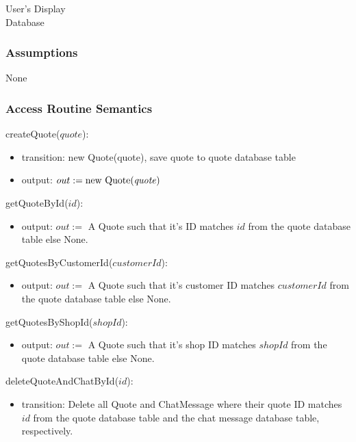 \documentclass[12pt, titlepage]{article}
\begin{document}
User's Display \\ Database

\subsubsection{Assumptions}

None

\subsubsection{Access Routine Semantics}

\noindent createQuote($quote$):
\begin{itemize}
	\item transition: new Quote(quote), save quote to quote database table
	\item output: $out := \text{new Quote(\emph{quote})}$
\end{itemize}

\noindent getQuoteById($id$):
\begin{itemize}
	\item output: $out :=$ A Quote such that it's ID matches $id$ from the quote database table else None.
\end{itemize}

\noindent getQuotesByCustomerId($customerId$):
\begin{itemize}
	\item output: $out :=$ A Quote such that it's customer ID matches $customerId$ from the quote database
	      table else None.
\end{itemize}

\noindent getQuotesByShopId($shopId$):
\begin{itemize}
	\item output: $out :=$ A Quote such that it's shop ID matches $shopId$ from the quote database table else
	      None.
\end{itemize}

\noindent deleteQuoteAndChatById($id$):
\begin{itemize}
	\item transition: Delete all Quote and ChatMessage where their quote ID matches $id$ from the quote
	      database table and the chat message database table, respectively.
\end{itemize}
\end{document}
